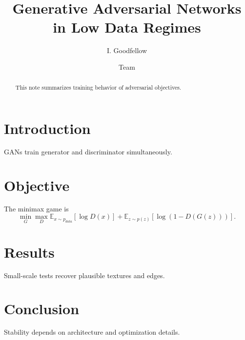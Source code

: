 \documentclass[sigconf]{acmart}
\begin{document}
\title{Generative Adversarial Networks in Low Data Regimes}
\author{I. Goodfellow}
\author{Team}
\begin{abstract}
This note summarizes training behavior of adversarial objectives.
\end{abstract}

\renewcommand\footnotetextcopyrightpermission[1]{}
\maketitle
\thispagestyle{plain}
\pagestyle{plain}
\section{Introduction}
GANs train generator and discriminator simultaneously.

\FloatBarrier
\section{Objective}
The minimax game is
\begin{equation}
\min_G \max_D \mathbb{E}_{x\sim p_{data}}[\log D(x)] + \mathbb{E}_{z\sim p(z)}[\log(1-D(G(z)))].
\end{equation}

\FloatBarrier
\section{Results}
Small-scale tests recover plausible textures and edges.

\FloatBarrier
\section{Conclusion}
Stability depends on architecture and optimization details.

\FloatBarrier


\end{document}
